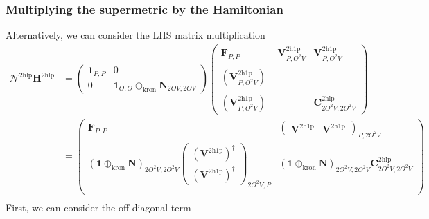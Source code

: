 \subsubsection{Multiplying the supermetric by the Hamiltonian}
Alternatively, we can consider the LHS matrix multiplication
\begin{align}
    \bm{\mathcal{N}}^{2 \mathrm{hlp}} \bm{H}^{2 \mathrm{hlp}} &= \begin{pmatrix}
        \bm{1}_{P,P} & 0 \\
        0 & \bm{1}_{O,O} \oplus_{\text{kron}} \bm{N}_{2OV,2OV}
    \end{pmatrix}
    \begin{pmatrix}
        \bm{F}_{P,P} & \bm{V}^{2\mathrm{h1p}}_{P,O^2V} & \bm{V}^{2\mathrm{h1p}}_{P,O^2V} \\
        \left(\bm{V}^{2\mathrm{h1p}}_{P,O^2V}\right)^{\dagger} &  &  \\
        \left(\bm{V}^{2\mathrm{h1p}}_{P,O^2V}\right)^{\dagger} &  & \bm{C}^{2\mathrm{hlp}}_{2O^2V,2O^2V}
    \end{pmatrix} \\
&= \begin{pmatrix}        \bm{F}_{P,P} & \begin{pmatrix} \bm{V}^{2\mathrm{h1p}} & \bm{V}^{2\mathrm{h1p}}\end{pmatrix}_{P,2O^2V} \\
        \left( \bm{1} \oplus_{\text{kron}} \bm{N} \right)_{2O^2V,2O^2V}\begin{pmatrix} \left(\bm{V}^{2\mathrm{h1p}}\right)^{\dagger} \\ \left( \bm{V}^{2\mathrm{h1p}}\right)^{\dagger} \end{pmatrix}_{2O^2V,P} &   \left( \bm{1} \oplus_{\text{kron}} \bm{N} \right)_{2O^2V,2O^2V} \bm{C}^{2\mathrm{hlp}}_{2O^2V,2O^2V}  \\
    \end{pmatrix} \\
\end{align}
First, we can consider the off diagonal term

